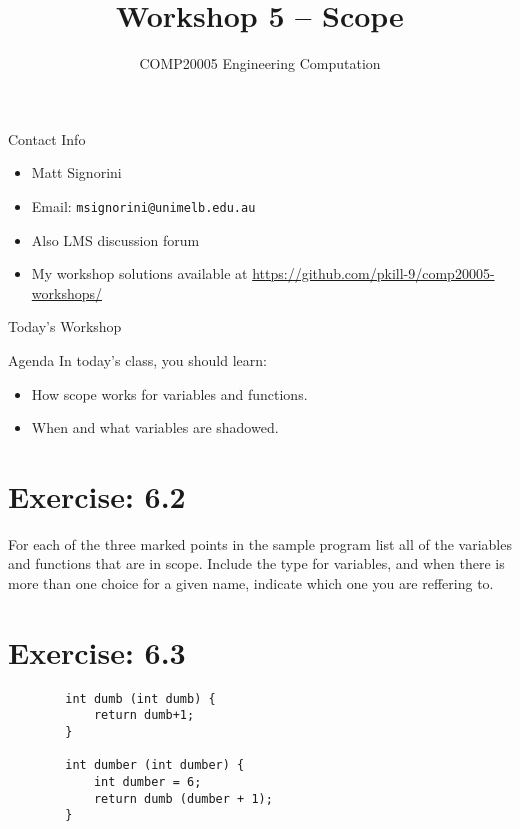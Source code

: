 \documentclass{beamer}
\title{Workshop 5 -- Scope}
\author{COMP20005 Engineering Computation}
\institute{The University of Melbourne}
\begin{document}
\begin{frame}
    \titlepage
\end{frame}

\begin{frame}{Contact Info}
    \begin{itemize}
        \item Matt Signorini
        \item Email: \texttt{msignorini@unimelb.edu.au}
        \item Also LMS discussion forum
        \item My workshop solutions available at \url{https://github.com/pkill-9/comp20005-workshops/}
    \end{itemize}
\end{frame}

\begin{frame}{Today's Workshop}
    \begin{block}{Agenda}
        In today's class, you should learn:
        \begin{itemize}
            \item How scope works for variables and functions.
            \item When and what variables are shadowed.
        \end{itemize}
    \end{block}
\end{frame}

\section{Exercise: 6.2}

\begin{frame}{6.2}
    For each of the three marked points in the sample program list all of
    the variables and functions that are in scope. Include the type for
    variables, and when there is more than one choice for a given name, 
    indicate which one you are reffering to.
\end{frame}

\section{Exercise: 6.3}

\begin{frame}[fragile]{6.3}
    \begin{verbatim}
        int dumb (int dumb) {
            return dumb+1;
        }

        int dumber (int dumber) {
            int dumber = 6;
            return dumb (dumber + 1);
        }
    \end{verbatim}
\end{frame}
\end{document}
